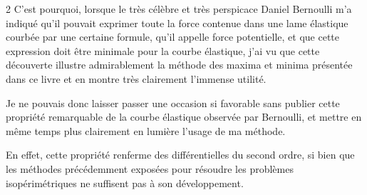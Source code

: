 \documentclass[a4paper,10pt]{article}
\begin{document}
\begin{multicols}{2}
C’est pourquoi, lorsque le très célèbre et très perspicace Daniel Bernoulli m’a indiqué qu’il pouvait exprimer toute la force contenue dans une lame élastique courbée par une certaine formule, qu’il appelle force potentielle, et que cette expression doit être minimale pour la courbe élastique, j’ai vu que cette découverte illustre admirablement la méthode des maxima et minima présentée dans ce livre et en montre très clairement l’immense utilité.

Je ne pouvais donc laisser passer une occasion si favorable sans publier cette propriété remarquable de la courbe élastique observée par Bernoulli, et mettre en même temps plus clairement en lumière l’usage de ma méthode.

En effet, cette propriété renferme des différentielles du second ordre, si bien que les méthodes précédemment exposées pour résoudre les problèmes isopérimétriques ne suffisent pas à son développement.
\end{multicols}
\end{document}
